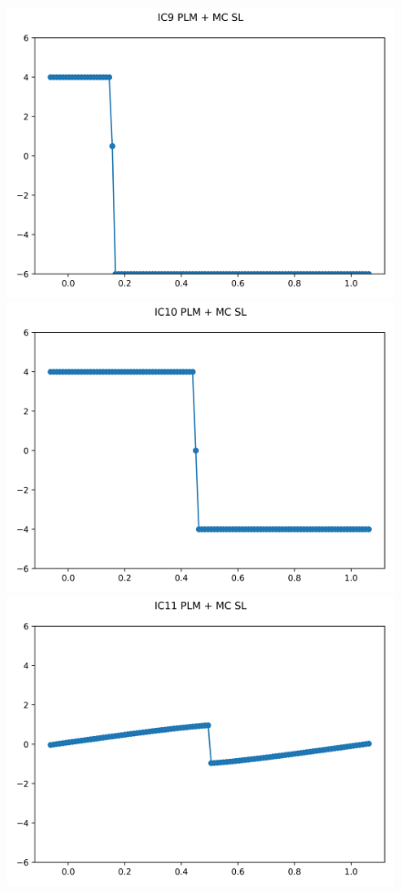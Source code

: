 \documentclass{article}
\begin{document}
\begin{figure}[t]
        \includegraphics[width=.95\textwidth]{../../code/hires_IC9Methodpo_plot.png}
        \includegraphics[width=.95\textwidth]{../../code/hires_IC10Methodpo_plot.png}
        \includegraphics[width=.95\textwidth]{../../code/hires_IC11Methodpo_plot.png}

\end{figure}
\end{document}
